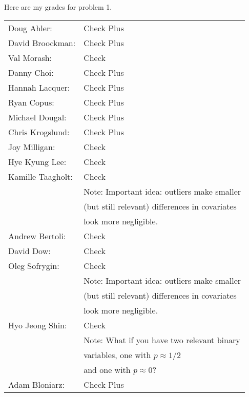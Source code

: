 \documentclass{article}[12pt]
\begin{document}
 Here are my grades for problem 1.\\[2ex]
 \begin{center}
 \begin{tabular}{ll}
  Doug Ahler:& Check Plus\\
  David Broockman:& Check Plus\\
  Val Morash: &Check\\
  Danny Choi: &Check Plus\\
  Hannah Lacquer:& Check Plus\\
  Ryan Copus: &Check Plus\\
  Michael Dougal:& Check Plus\\
  Chris Krogslund: &Check Plus\\
  Joy Milligan:& Check\\
  Hye Kyung Lee:& Check\\
  Kamille Taagholt:& Check \\
  & Note: Important idea: outliers make smaller \\
  & (but still relevant) differences in covariates \\ 
  & look more negligible. \\ 
 Andrew Bertoli: & Check\\
 David Dow: & Check\\
 Oleg Sofrygin: & Check \\
  & Note: Important idea: outliers make smaller \\
  & (but still relevant) differences in covariates \\ 
  & look more negligible. \\ 
  Hyo Jeong Shin: & Check \\
  & Note: What if you have two relevant binary \\
  & variables, one with $p \approx 1/2$ \\ 
  & and one with $p \approx 0$? \\ 
  Adam Bloniarz: & Check Plus
 \end{tabular}
 \end{center}
\end{document}
